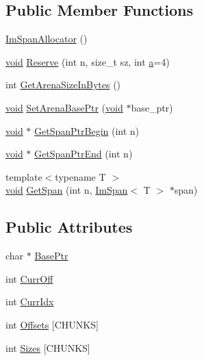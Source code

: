 \subsection*{Public Member Functions}
\begin{DoxyCompactItemize}
\item 
\hyperlink{structImSpanAllocator_afdf8fba72df5de9e2f42fabb2e8f62b6}{Im\+Span\+Allocator} ()
\item 
\hyperlink{imgui__impl__opengl3__loader_8h_ac668e7cffd9e2e9cfee428b9b2f34fa7}{void} \hyperlink{structImSpanAllocator_a89b08935873f324a44642c9be7388004}{Reserve} (int n, size\+\_\+t sz, int \hyperlink{pointer_8h_aeeddce917cf130d62c370b8f216026dd}{a}=4)
\item 
int \hyperlink{structImSpanAllocator_a6bdfe0539ad0cba8d9cb616ff20ae695}{Get\+Arena\+Size\+In\+Bytes} ()
\item 
\hyperlink{imgui__impl__opengl3__loader_8h_ac668e7cffd9e2e9cfee428b9b2f34fa7}{void} \hyperlink{structImSpanAllocator_af379bb313a9dae91ee56093aa81d83f3}{Set\+Arena\+Base\+Ptr} (\hyperlink{imgui__impl__opengl3__loader_8h_ac668e7cffd9e2e9cfee428b9b2f34fa7}{void} $\ast$base\+\_\+ptr)
\item 
\hyperlink{imgui__impl__opengl3__loader_8h_ac668e7cffd9e2e9cfee428b9b2f34fa7}{void} $\ast$ \hyperlink{structImSpanAllocator_a3b876e03f356657b590cd211ebd7bc56}{Get\+Span\+Ptr\+Begin} (int n)
\item 
\hyperlink{imgui__impl__opengl3__loader_8h_ac668e7cffd9e2e9cfee428b9b2f34fa7}{void} $\ast$ \hyperlink{structImSpanAllocator_a42d9ed4042297bb0b499825e48bde371}{Get\+Span\+Ptr\+End} (int n)
\item 
{\footnotesize template$<$typename T $>$ }\\\hyperlink{imgui__impl__opengl3__loader_8h_ac668e7cffd9e2e9cfee428b9b2f34fa7}{void} \hyperlink{structImSpanAllocator_a47aaeac7a303ec0d3a52e59189c4c627}{Get\+Span} (int n, \hyperlink{structImSpan}{Im\+Span}$<$ T $>$ $\ast$span)
\end{DoxyCompactItemize}
\subsection*{Public Attributes}
\begin{DoxyCompactItemize}
\item 
char $\ast$ \hyperlink{structImSpanAllocator_a13ffffaa95637e4c95d215414f9600fd}{Base\+Ptr}
\item 
int \hyperlink{structImSpanAllocator_aee84402fdab48c9a6a14994ae525d503}{Curr\+Off}
\item 
int \hyperlink{structImSpanAllocator_a5ef3ee2f2ba50bf7fe63c81decfa75e7}{Curr\+Idx}
\item 
int \hyperlink{structImSpanAllocator_a480822668b44faa98ae0363765059c06}{Offsets} \mbox{[}C\+H\+U\+N\+KS\mbox{]}
\item 
int \hyperlink{structImSpanAllocator_afe77e900299427326cd6ba4f2a868897}{Sizes} \mbox{[}C\+H\+U\+N\+KS\mbox{]}
\end{DoxyCompactItemize}


